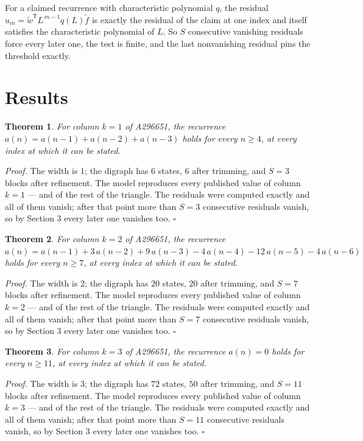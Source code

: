 \documentclass[11pt]{article}
\newtheorem{theorem}{Theorem}
\theoremstyle{definition}
\begin{document}
For a claimed recurrence with characteristic polynomial $q$, the residual $u_m = \tilde w^{\mathsf T}L^{\,m-1}q(L)\tilde f$ is exactly the residual of the claim at one index and itself satisfies the characteristic polynomial of $L$. So $S$ consecutive vanishing residuals force every later one, the test is finite, and the last nonvanishing residual pins the threshold exactly.

\section{Results}

\begin{theorem} For column $k = 1$ of A296651, the recurrence $a(n) = a(n-1) + a(n-2) + a(n-3)$ holds for every $n \ge 4$, at every index at which it can be stated.\end{theorem}

{\itshape Proof.} The width is $1$; the digraph has $6$ states, $6$ after trimming, and $S = 3$ blocks after refinement. The model reproduces every published value of column $k = 1$ --- and of the rest of the triangle. The residuals were computed exactly and all of them vanish; after that point more than $S = 3$ consecutive residuals vanish, so by Section 3 every later one vanishes too. $\square$

\begin{theorem} For column $k = 2$ of A296651, the recurrence $a(n) = a(n-1) + 3\,a(n-2) + 9\,a(n-3) - 4\,a(n-4) - 12\,a(n-5) - 4\,a(n-6)$ holds for every $n \ge 7$, at every index at which it can be stated.\end{theorem}

{\itshape Proof.} The width is $2$; the digraph has $20$ states, $20$ after trimming, and $S = 7$ blocks after refinement. The model reproduces every published value of column $k = 2$ --- and of the rest of the triangle. The residuals were computed exactly and all of them vanish; after that point more than $S = 7$ consecutive residuals vanish, so by Section 3 every later one vanishes too. $\square$

\begin{theorem} For column $k = 3$ of A296651, the recurrence $a(n) = 0$ holds for every $n \ge 11$, at every index at which it can be stated.\end{theorem}

{\itshape Proof.} The width is $3$; the digraph has $72$ states, $50$ after trimming, and $S = 11$ blocks after refinement. The model reproduces every published value of column $k = 3$ --- and of the rest of the triangle. The residuals were computed exactly and all of them vanish; after that point more than $S = 11$ consecutive residuals vanish, so by Section 3 every later one vanishes too. $\square$
\end{document}
